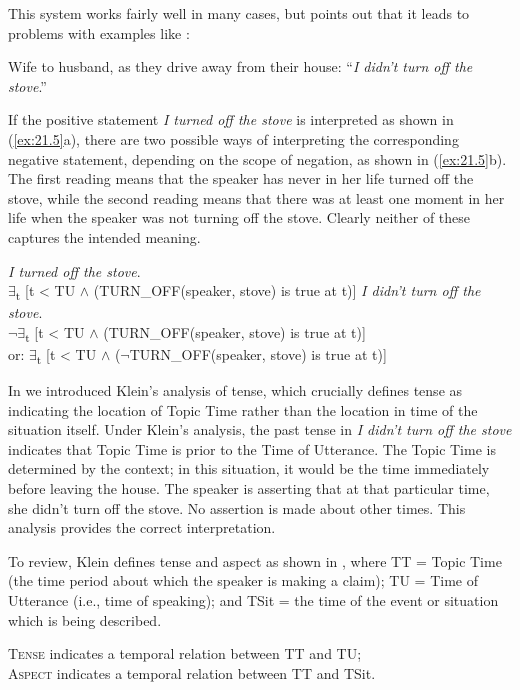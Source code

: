 This system works fairly well in many cases, but \citet{Partee1973} points out that it leads to problems with examples like :


\ea \label{ex:21.4}
Wife to husband, as they drive away from their house: “\textit{I didn’t turn off the stove}.”
\z


If the positive statement \textit{I turned off the stove} is interpreted as shown in (\ref{ex:21.5}a), there are two possible ways of interpreting the corresponding negative statement, depending on the scope of negation, as shown in (\ref{ex:21.5}b). The first reading means that the speaker has never in her life turned off the stove, while the second reading means that there was at least one moment in her life when the speaker was not turning off the stove. Clearly neither of these captures the intended meaning.


\ea \label{ex:21.5}
\ea   \textit{I turned off the stove}. \\ 
${\exists}$\textsubscript{t} [t < TU $\wedge$ (TURN\_OFF(speaker, stove) is true at t)]
\ex   \textit{I didn’t turn off the stove}. \\
$¬{\exists}$\textsubscript{t} [t < TU $\wedge$ (TURN\_OFF(speaker, stove) is true at t)]\\
  or:  ${\exists}$\textsubscript{t} [t < TU $\wedge$ ($¬$TURN\_OFF(speaker, stove) is true at t)]
\z \z

In  we introduced Klein’s analysis of tense, which crucially defines tense as indicating the location of Topic Time rather than the location in time of the situation itself. Under Klein’s analysis, the past tense in  \textit{I didn’t turn off the stove} indicates that Topic Time is prior to the Time of Utterance. The Topic Time is determined by the context; in this situation, it would be the time immediately before leaving the house. The speaker is asserting that at that particular time, she didn’t turn off the stove. No assertion is made about other times. This analysis provides the correct interpretation.


To review, Klein defines tense and aspect as shown in , where TT = Topic Time (the time period about which the speaker is making a claim); TU = Time of Utterance (i.e., time of speaking); and TSit = the time of the event or situation which is being described.


\ea \label{ex:21.6}
\ea  \textsc{Tense} indicates a temporal relation between TT and TU;\\
\ex \textsc{Aspect} indicates a temporal relation between TT and TSit.
                       \z
\z


